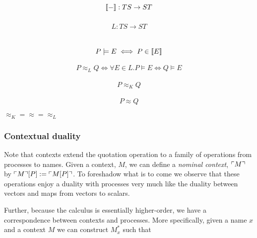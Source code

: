 \documentclass[12pt]{llncs}
\begin{document}

\begin{eqnarray*}
  \\
  \meaningof{-} : TS \to ST
\end{eqnarray*}

\begin{eqnarray*}
  \\
  L : TS \to ST
\end{eqnarray*}

\begin{eqnarray*}
  \\
  P \models E \iff P \in [\![ E ]\!]
\end{eqnarray*}

\begin{eqnarray*}
  P \approx_{L} Q \iff \forall E \in L. P \models E \iff Q \models E
\end{eqnarray*}

\begin{eqnarray*}
  P \approx_{K} Q
\end{eqnarray*}

\begin{eqnarray*}
  P \approx Q
\end{eqnarray*}

$\approx_{K} = \approx = \approx_{L}$

\subsubsection{Contextual duality}

Note that contexts extend the quotation operation to a family of
operations from processes to names. Given a context, $M$, we can
define a \emph{nominal context}, $\ulcorner M \urcorner$ by $\ulcorner M \urcorner[P] :=
\ulcorner M[P] \urcorner$. To foreshadow what is to come we observe that these
operations enjoy a duality with processes very much like the duality
between vectors and maps from vectors to scalars.

Further, because the calculus is essentially higher-order, we have a
correspondence between contexts and processes. More specifically,
given a name $x$ and a context $M$ we can construct $M^{*}_{x}$ such
that 
\end{document}
